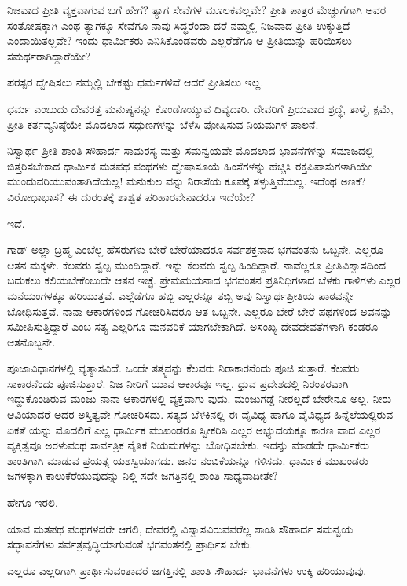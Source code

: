 ನಿಜವಾದ ಪ್ರೀತಿ ವ್ಯಕ್ತವಾಗುವ ಬಗೆ ಹೇಗೆ? ತ್ಯಾಗ ಸೇವೆಗಳ ಮೂಲಕವಲ್ಲವೇ? ಪ್ರೀತಿ ಪಾತ್ರರ ಮೆಚ್ಚುಗೆಗಾಗಿ ಅವರ ಸಂತೋಷಕ್ಕಾಗಿ ಎಂಥ ತ್ಯಾಗಕ್ಕೂ ಸೇವೆಗೂ ನಾವು ಸಿದ್ಧರೆಂದಾ ದರೆ ನಮ್ಮಲ್ಲಿ ನಿಜವಾದ ಪ್ರೀತಿ ಉಕ್ಕುತ್ತಿದೆ ಎಂದಾಯಿತಲ್ಲವೇ? ಇಂದು ಧಾರ್ಮಿಕರು ಎನಿಸಿಕೊಂಡವರು ಎಲ್ಲರೆಡೆಗೂ ಆ ಪ್ರೀತಿಯನ್ನು ಹರಿಯಿಸಲು ಸಮರ್ಥರಾಗಿದ್ದಾರೆಯೇ?

ಪರಸ್ಪರ ದ್ವೇಷಿಸಲು ನಮ್ಮಲ್ಲಿ ಬೇಕಷ್ಟು ಧರ್ಮಗಳಿವೆ ಆದರೆ ಪ್ರೀತಿಸಲು ಇಲ್ಲ.

ಧರ್ಮ ಎಂಬುದು ದೇವರತ್ತ ಮನುಷ್ಯನನ್ನು ಕೊಂಡೊಯ್ಯುವ ದಿವ್ಯದಾರಿ. ದೇವರಿಗೆ ಪ್ರಿಯವಾದ ಶ್ರದ್ಧೆ, ತಾಳ್ಮೆ, ಕ್ಷಮೆ, ಪ್ರೀತಿ ಕರ್ತವ್ಯನಿಷ್ಠೆಯೇ ಮೊದಲಾದ ಸದ್ಗುಣಗಳನ್ನು ಬೆಳೆಸಿ ಪೋಷಿಸುವ ನಿಯಮಗಳ ಪಾಲನೆ.

ನಿಸ್ವಾರ್ಥ ಪ್ರೀತಿ ಶಾಂತಿ ಸೌಹಾರ್ದ ಸಾಮರಸ್ಯ ಮತ್ತು ಸಮನ್ವಯವೇ ಮೊದಲಾದ ಭಾವನೆಗಳನ್ನು ಸಮಾಜದಲ್ಲಿ ಬಿತ್ತರಿಸಬೇಕಾದ ಧಾರ್ಮಿಕ ಮತಪಥ ಪಂಥಗಳು ದ್ವೇಷಾಸೂಯೆ ಹಿಂಸೆಗಳನ್ನು ಹೆಚ್ಚಿಸಿ ರಕ್ತಪಿಪಾಸುಗಳಾಗಿಯೇ ಮುಂದುವರಿಯುವಂತಾಗಿದೆಯಲ್ಲ! ಮನುಕುಲ ವನ್ನು ನಿರಾಸೆಯ ಕೂಪಕ್ಕೆ ತಳ್ಳುತ್ತಿವೆಯಲ್ಲ. ಇದೆಂಥ ಅಣಕ? ವಿರೋಧಾಭಾಸ? ಈ ದುರಂತಕ್ಕೆ ಶಾಶ್ವತ ಪರಿಹಾರವೇನಾದರೂ ಇದೆಯೇ?

ಇದೆ.

ಗಾಡ್ ಅಲ್ಲಾ ಬ್ರಹ್ಮ ಎಂಬೆಲ್ಲ ಹೆಸರುಗಳು ಬೇರೆ ಬೇರೆಯಾದರೂ ಸರ್ವಶಕ್ತನಾದ ಭಗವಂತನು ಒಬ್ಬನೇ. ಎಲ್ಲರೂ ಆತನ ಮಕ್ಕಳೇ. ಕೆಲವರು ಸ್ವಲ್ಪ ಮುಂದಿದ್ದಾರೆ. ಇನ್ನು ಕೆಲವರು ಸ್ವಲ್ಪ ಹಿಂದಿದ್ದಾರೆ. ನಾವೆಲ್ಲರೂ ಪ್ರೀತಿವಿಶ್ವಾಸದಿಂದ ಬದುಕಲು ಕಲಿಯಬೇಕೆಂಬುದೇ ಆತನ ಇಚ್ಛೆ. ಪ್ರೇಮಮಯನಾದ ಭಗವಂತನ ಪ್ರತಿನಿಧಿಗಳಾದ ಬೆಳಕು ಗಾಳಿಗಳು ಎಲ್ಲರ ಮನೆಯಂಗಳಕ್ಕೂ ಹರಿಯುತ್ತವೆ. ಎಲ್ಲೆಡೆಗೂ ಹಬ್ಬಿ ಎಲ್ಲರನ್ನೂ ತಬ್ಬಿ ಅವು ನಿಸ್ವಾರ್ಥಪ್ರೀತಿಯ ಪಾಠವನ್ನೇ ಬೋಧಿಸುತ್ತವೆ. ನಾನಾ ಆಕಾರಗಳಿಂದ ಗೋಚರಿಸಿದರೂ ಆತ ಒಬ್ಬನೇ. ಎಲ್ಲರೂ ಬೇರೆ ಬೇರೆ ಪಥಗಳಿಂದ ಅವನನ್ನು ಸಮೀಪಿಸುತ್ತಿದ್ದಾರೆ ಎಂಬ ಸತ್ಯ ಎಲ್ಲರಿಗೂ ಮನವರಿಕೆ ಯಾಗಬೇಕಾಗಿದೆ. ಅಸಂಖ್ಯ ದೇವದೇವತೆಗಳಾಗಿ ಕಂಡರೂ ಆತನೊಬ್ಬನೇ.

ಪೂಜಾವಿಧಾನಗಳಲ್ಲಿ ವ್ಯತ್ಯಾಸವಿದೆ. ಒಂದೇ ತತ್ತ್ವವನ್ನು ಕೆಲವರು ನಿರಾಕಾರನೆಂದು ಪೂಜಿ ಸುತ್ತಾರೆ. ಕೆಲವರು ಸಾಕಾರನೆಂದು ಪೂಜಿಸುತ್ತಾರೆ. ನಿಜ ನೀರಿಗೆ ಯಾವ ಆಕಾರವೂ ಇಲ್ಲ. ಧ್ರುವ ಪ್ರದೇಶದಲ್ಲಿ ನಿರಂತರವಾಗಿ ಇದ್ದುಕೊಂಡಿರುವ ಮಂಜು ನಾನಾ ಆಕಾರಗಳಲ್ಲಿ ವ್ಯಕ್ತವಾಗು ವುದು. ಮಂಜುಗಡ್ಡೆ ನೀರಲ್ಲದೆ ಬೇರೇನೂ ಅಲ್ಲ. ನೀರು ಆವಿಯಾದರೆ ಅದರ ಅಸ್ತಿತ್ವವೇ ಗೋಚರಿಸದು. ಸತ್ಯದ ಬೆಳಕಿನಲ್ಲಿ ಈ ವೈವಿಧ್ಯ ಹಾಗೂ ವೈವಿಧ್ಯದ ಹಿನ್ನೆಲೆಯಲ್ಲಿರುವ ಏಕತೆ ಯನ್ನು ಮೊದಲಿಗೆ ಎಲ್ಲ ಧಾರ್ಮಿಕ ಮುಖಂಡರೂ ಸ್ವೀಕರಿಸಿ ಎಲ್ಲರ ಅಭ್ಯುದಯಕ್ಕೂ ಕಾರಣ ವಾದ ಎಲ್ಲರ ವ್ಯಕ್ತಿತ್ವವೂ ಅರಳುವಂಥ ಸಾರ್ವತ್ರಿಕ ನೈತಿಕ ನಿಯಮಗಳನ್ನು ಬೋಧಿಸಬೇಕು. ಇದನ್ನು ಮಾಡದೇ ಧಾರ್ಮಿಕರು ಶಾಂತಿಗಾಗಿ ಮಾಡುವ ಪ್ರಯತ್ನ ಯಶಸ್ವಿಯಾಗದು. ಜನರ ನಂಬಿಕೆಯನ್ನೂ ಗಳಿಸದು. ಧಾರ್ಮಿಕ ಮುಖಂಡರು ಜಗಳಕ್ಕಾಗಿ ಕಾಲುಕೆರೆಯುವುದನ್ನು ನಿಲ್ಲಿ ಸದೇ ಜಗತ್ತಿನಲ್ಲಿ ಶಾಂತಿ ಸಾಧ್ಯವಾದೀತೇ?

ಹೇಗೂ ಇರಲಿ.

ಯಾವ ಮತಪಥ ಪಂಥಗಳವರೇ ಆಗಲಿ, ದೇವರಲ್ಲಿ ವಿಶ್ವಾಸವಿರುವವರೆಲ್ಲ ಶಾಂತಿ ಸೌಹಾರ್ದ ಸಮನ್ವಯ ಸದ್ಭಾವನೆಗಳು ಸರ್ವತ್ರವೃದ್ಧಿಯಾಗುವಂತೆ ಭಗವಂತನಲ್ಲಿ ಪ್ರಾರ್ಥಿಸ ಬೇಕು.

ಎಲ್ಲರೂ ಎಲ್ಲರಿಗಾಗಿ ಪ್ರಾರ್ಥಿಸುವಂತಾದರೆ ಜಗತ್ತಿನಲ್ಲಿ ಶಾಂತಿ ಸೌಹಾರ್ದ ಭಾವನೆಗಳು ಉಕ್ಕಿ ಹರಿಯುವುವು.


